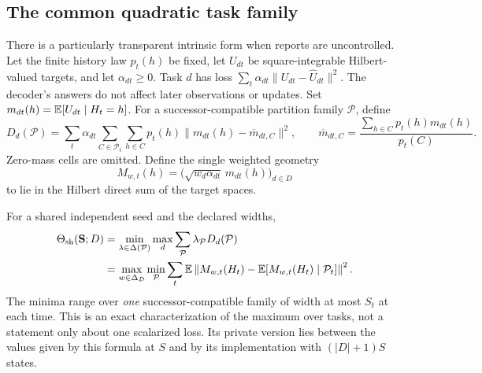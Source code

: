 \subsection{The common quadratic task family}
There is a particularly transparent intrinsic form when reports are
uncontrolled. Let the finite history law $p_t(h)$ be fixed, let
$U_{dt}$ be square-integrable Hilbert-valued targets, and let
$\alpha_{dt}\ge0$. Task $d$ has loss
$\sum_t\alpha_{dt}\|U_{dt}-\widehat U_{dt}\|^2$.
The decoder's answers do not affect later observations or updates.
Set $m_{dt}(h)=\mathbb E[U_{dt}\mid H_t=h]$. For a successor-compatible
partition family $\mathcal P$, define
\begin{equation}
 D_d(\mathcal P)=\sum_t\alpha_{dt}\sum_{C\in\mathcal P_t}
       \sum_{h\in C}p_t(h)\|m_{dt}(h)-\overline m_{dt,C}\|^2,
 \qquad
 \overline m_{dt,C}=\frac{\sum_{h\in C}p_t(h)m_{dt}(h)}{p_t(C)}.
 \label{eq:v9-vectorvariance}
\end{equation}
Zero-mass cells are omitted. Define the single weighted geometry
\[
 M_{w,t}(h)=\big(\sqrt{w_d\alpha_{dt}}\,m_{dt}(h)\big )_{d\in D}
\]
to lie in the Hilbert direct sum of the target spaces.
\begin{corollary}\label{cor:v9-quadratic}
For a shared independent seed and the declared widths,
\begin{align}
 \Theta_{\rm sh}({\bf S};D)
 &=\min_{\lambda\in\Delta(\mathcal P)}
                       \max_d\sum_{\mathcal P}\lambda_{\mathcal P}
                                                   D_d(\mathcal P)\nonumber\\
 &=\max_{w\in\Delta_D}\min_{\mathcal P}
        \sum_t\mathbb E\left\|M_{w,t}(H_t)
                -\mathbb E[M_{w,t}(H_t)\mid\mathcal P_t]\right\|^2.
 \label{eq:v9-quadraticdual}
\end{align}
The minima range over \emph{one} successor-compatible family of width
at most $S_t$ at each time. This is an exact characterization of the
maximum over tasks, not a statement only about one scalarized loss.
Its private version lies between the values given by this formula at
$S$ and by its implementation with $(|D|+1)S$ states.
\end{corollary}
